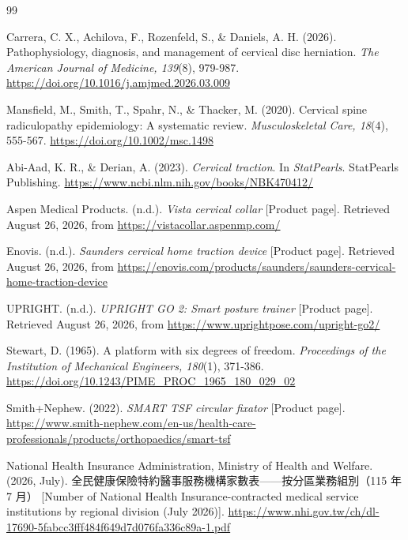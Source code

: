 \documentclass[12pt,a4paper]{article}
\begin{document}
\begin{thebibliography}{99}

    Carrera, C. X., Achilova, F., Rozenfeld, S., \& Daniels, A. H. (2026).
    Pathophysiology, diagnosis, and management of cervical disc herniation.
    \emph{The American Journal of Medicine, 139}(8), 979-987.
    \url{https://doi.org/10.1016/j.amjmed.2026.03.009}

    Mansfield, M., Smith, T., Spahr, N., \& Thacker, M. (2020).
    Cervical spine radiculopathy epidemiology: A systematic review.
    \emph{Musculoskeletal Care, 18}(4), 555-567.
    \url{https://doi.org/10.1002/msc.1498}

    Abi-Aad, K. R., \& Derian, A. (2023). \emph{Cervical traction}.
    In \emph{StatPearls}. StatPearls Publishing.
    \url{https://www.ncbi.nlm.nih.gov/books/NBK470412/}

    Aspen Medical Products. (n.d.). \emph{Vista cervical collar} [Product page].
    Retrieved August 26, 2026, from \url{https://vistacollar.aspenmp.com/}

    Enovis. (n.d.). \emph{Saunders cervical home traction device} [Product page].
    Retrieved August 26, 2026, from
    \url{https://enovis.com/products/saunders/saunders-cervical-home-traction-device}

    UPRIGHT. (n.d.). \emph{UPRIGHT GO 2: Smart posture trainer} [Product page].
    Retrieved August 26, 2026, from \url{https://www.uprightpose.com/upright-go2/}

    Stewart, D. (1965). A platform with six degrees of freedom.
    \emph{Proceedings of the Institution of Mechanical Engineers, 180}(1), 371-386.
    \url{https://doi.org/10.1243/PIME_PROC_1965_180_029_02}

    Smith+Nephew. (2022). \emph{SMART TSF circular fixator} [Product page].
    \url{https://www.smith-nephew.com/en-us/health-care-professionals/products/orthopaedics/smart-tsf}

    National Health Insurance Administration, Ministry of Health and Welfare. (2026, July).
    全民健康保險特約醫事服務機構家數表——按分區業務組別（115 年 7 月）
    [Number of National Health Insurance-contracted medical service institutions by regional division (July 2026)].
    \url{https://www.nhi.gov.tw/ch/dl-17690-5fabcc3fff484f649d7d076fa336c89a-1.pdf}


\end{thebibliography}
\end{document}
